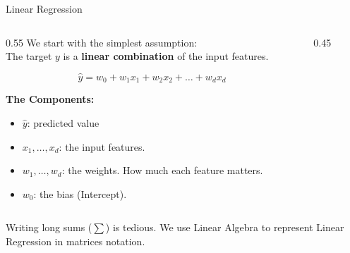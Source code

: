 \begin{frame}{Linear Regression}
    \begin{columns}[c]
        \begin{column}{0.55\textwidth}
            We start with the simplest assumption: \\
            The target $y$ is a \textbf{linear combination} of the input features.
            
            $$ \hat{y} = w_0 + w_1 x_1 + w_2 x_2 + \dots + w_d x_d $$
            
            \vspace{1em}
            \textbf{The Components:}
            \begin{itemize}
                \item $\hat{y}$: predicted value
                \item $x_1, \dots, x_d$: the input features.
                \item $w_1, \dots, w_d$: the weights. How much each feature matters.
                \item $w_0$: the bias (Intercept). 
                
            \end{itemize}
            
        \end{column}

       \begin{column}{0.45\textwidth}
            \centering
        \end{column}
    \end{columns}
    Writing long sums ($\sum$) is tedious. We use Linear Algebra to represent Linear Regression in matrices notation.
\end{frame}


